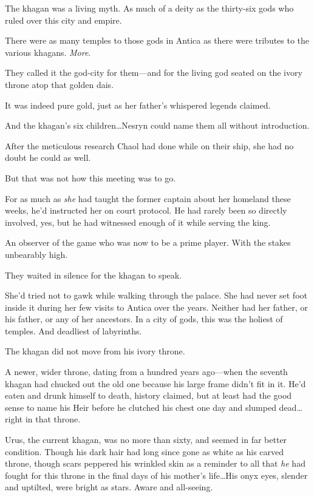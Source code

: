 The khagan was a living myth. As much of a deity as the thirty-six gods who ruled over this city and empire.

There were as many temples to those gods in Antica as there were tributes to the various khagans. \emph{More}.

They called it the god-city for them---and for the living god seated on the ivory throne atop that golden dais.

It was indeed pure gold, just as her father's whispered legends claimed.

And the khagan's six children\ldots Nesryn could name them all without introduction.

After the meticulous research Chaol had done while on their ship, she had no doubt he could as well.

But that was not how this meeting was to go.

For as much as \emph{she} had taught the former captain about her homeland these weeks, he'd instructed her on court protocol. He had rarely been so directly involved, yes, but he had witnessed enough of it while serving the king.

An observer of the game who was now to be a prime player. With the stakes unbearably high.

They waited in silence for the khagan to speak.

She'd tried not to gawk while walking through the palace. She had never set foot inside it during her few visits to Antica over the years. Neither had her father, or his father, or any of her ancestors. In a city of gods, this was the holiest of temples. And deadliest of labyrinths.

The khagan did not move from his ivory throne.

A newer, wider throne, dating from a hundred years ago---when the seventh khagan had chucked out the old one because his large frame didn't fit in it. He'd eaten and drunk himself to death, history claimed, but at least had the good sense to name his Heir before he clutched his chest one day and slumped dead\ldots right in that throne.

Urus, the current khagan, was no more than sixty, and seemed in far better condition. Though his dark hair had long since gone as white as his carved throne, though scars peppered his wrinkled skin as a reminder to all that \emph{he} had fought for this throne in the final days of his mother's life\ldots His onyx eyes, slender and uptilted, were bright as stars. Aware and all-seeing.

